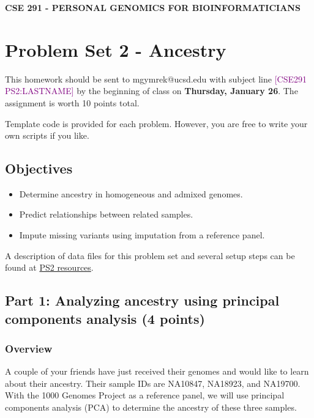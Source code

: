 \documentclass[12pt]{article}
\begin{document}
\textbf{CSE 291 - PERSONAL GENOMICS FOR BIOINFORMATICIANS}

\section*{Problem Set 2 - Ancestry}

This homework should be sent to mgymrek@ucsd.edu with subject line \textcolor{purple}{[CSE291 PS2:LASTNAME]} by the beginning of class on \textbf{Thursday, January 26}. The assignment is worth 10 points total.

Template code is provided for each problem. However, you are free to write your own scripts if you like.

\subsection*{Objectives}
\begin{itemize}
\setlength\itemsep{0.0em}
\item Determine ancestry in homogeneous and admixed genomes.
\item Predict relationships between related samples.
\item Impute missing variants using imputation from a reference panel.
\end{itemize}

A description of data files for this problem set and several setup steps can be found at \href{https://gymreklab.github.io/teaching/personal\_genomics/ps2\_resources.html}{PS2 resources}. 

\subsection*{Part 1: Analyzing ancestry using principal components analysis (4 points)}

\subsubsection*{Overview}

A couple of your friends have just received their genomes and would like to learn about their ancestry. Their sample IDs are NA10847, NA18923, and NA19700. With the 1000 Genomes Project as a reference panel, we will use principal components analysis (PCA) to determine the ancestry of these three samples.
\end{document}
